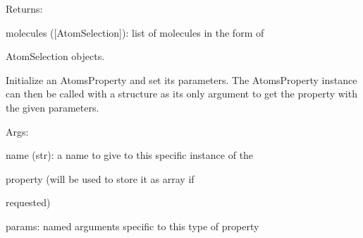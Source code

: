 \documentclass[letterpaper,10pt,english]{sphinxmanual}
\begin{document}
\begin{fulllineitems}
\begin{DUlineblock}{0em}
\item[] Returns:
\item[]
\begin{DUlineblock}{\DUlineblockindent}
\item[] molecules ({[}AtomSelection{]}): list of molecules in the form of
\item[]
\begin{DUlineblock}{\DUlineblockindent}
\item[] AtomSelection objects.
\end{DUlineblock}
\end{DUlineblock}
\end{DUlineblock}

Initialize an AtomsProperty and set its parameters.
The AtomsProperty instance can then be called with a structure as its
only argument to get the property with the given parameters.

\begin{DUlineblock}{0em}
\item[] Args:
\item[]
\begin{DUlineblock}{\DUlineblockindent}
\item[] name (str): a name to give to this specific instance of the
\item[]
\begin{DUlineblock}{\DUlineblockindent}
\item[] property (will be used to store it as array if
\item[] requested)
\end{DUlineblock}
\item[] params: named arguments specific to this type of property
\end{DUlineblock}
\end{DUlineblock}

\begin{fulllineitems}
\label{doctree/soprano.properties.linkage.linkage:soprano.properties.linkage.linkage.Molecules.default_name}
\end{fulllineitems}


\begin{fulllineitems}
\label{doctree/soprano.properties.linkage.linkage:soprano.properties.linkage.linkage.Molecules.default_params}
\end{fulllineitems}


\end{fulllineitems}
\end{document}
